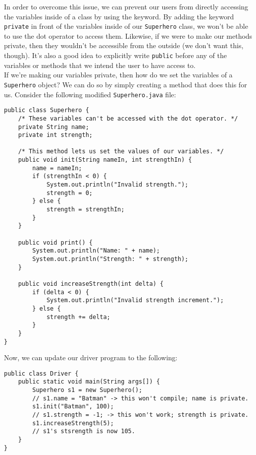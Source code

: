 In order to overcome this issue, we can prevent our users from directly accessing the variables inside of a class by using the  keyword. By adding the keyword \verb!private! in front of the variables inside of our \verb!Superhero! class, we won't be able to use the dot operator to access them. Likewise, if we were to make our methods private, then they wouldn't be accessible from the outside (we don't want this, though). It's also a good idea to explicitly write \verb!public! before any of the variables or methods that we intend the user to have access to. \\

If we're making our variables private, then how do we set the variables of a \verb!Superhero! object? We can do so by simply creating a method that does this for us. Consider the following modified \verb!Superhero.java! file:

\begin{lstlisting}
public class Superhero {
    /* These variables can't be accessed with the dot operator. */
    private String name;
    private int strength;
    
    /* This method lets us set the values of our variables. */
    public void init(String nameIn, int strengthIn) {
        name = nameIn;
        if (strengthIn < 0) {
            System.out.println("Invalid strength.");
            strength = 0;
        } else {
            strength = strengthIn;
        }
    }
    
    public void print() {
        System.out.println("Name: " + name);
        System.out.println("Strength: " + strength);
    }
    
    public void increaseStrength(int delta) {
        if (delta < 0) {
            System.out.println("Invalid strength increment.");
        } else {
            strength += delta;
        }
    }
}
\end{lstlisting}

\noindent Now, we can update our driver program to the following:



\begin{lstlisting}
public class Driver {
    public static void main(String args[]) {
        Superhero s1 = new Superhero();
        // s1.name = "Batman" -> this won't compile; name is private.
        s1.init("Batman", 100); 
        // s1.strength = -1; -> this won't work; strength is private.
        s1.increaseStrength(5);
        // s1's stsrength is now 105.
    }
}
\end{lstlisting}

